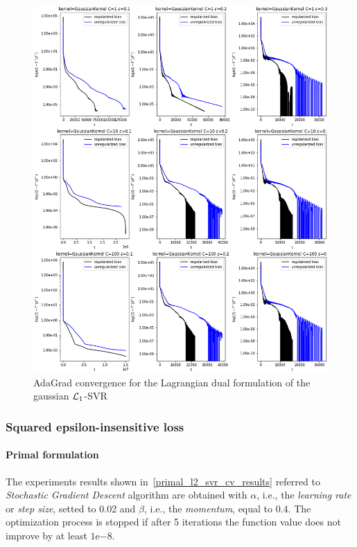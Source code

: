 \begin{figure}[H]
	\centering
	\includegraphics[scale=0.55]{img/gaussian_lagrangian_dual_l1_svr_loss_history}
	\caption{AdaGrad convergence for the Lagrangian dual formulation of the gaussian $\protect \mathcal{L}_1$-SVR}
	\label{fig:gaussian_lagrangian_dual_l1_svr_loss_history}
\end{figure}

\pagebreak

\subsubsection{Squared epsilon-insensitive loss}

\paragraph{Primal formulation}

The experiments results shown in~\ref{primal_l2_svr_cv_results} referred to \emph{Stochastic Gradient Descent} algorithm are obtained with $\alpha$, i.e., the \emph{learning rate} or \emph{step size}, setted to 0.02 and $\beta$, i.e., the \emph{momentum}, equal to 0.4. The optimization process is stopped if after 5 iterations the function value does not improve by at least $1\mathrm{e}{-8}$.

